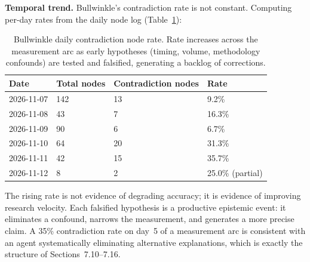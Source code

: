 \documentclass[11pt]{article}
\begin{document}
\textbf{Temporal trend.} Bullwinkle's contradiction rate is not constant. Computing per-day rates from the daily node log (Table~\ref{tab:bw-contradiction-daily}):

\begin{table}[h]
\centering
\begin{tabular}{llll}
\hline
Date & Total nodes & Contradiction nodes & Rate \\
\hline
2026-11-07 & 142 & 13 & 9.2\% \\
2026-11-08 &  43 &  7 & 16.3\% \\
2026-11-09 &  90 &  6 &  6.7\% \\
2026-11-10 &  64 & 20 & 31.3\% \\
2026-11-11 &  42 & 15 & 35.7\% \\
2026-11-12 &   8 &  2 & 25.0\% (partial) \\
\hline
\end{tabular}
\caption{Bullwinkle daily contradiction node rate. Rate increases across the measurement arc as early hypotheses (timing, volume, methodology confounds) are tested and falsified, generating a backlog of corrections.}
\label{tab:bw-contradiction-daily}
\end{table}

The rising rate is not evidence of degrading accuracy; it is evidence of improving research velocity. Each falsified hypothesis is a productive epistemic event: it eliminates a confound, narrows the measurement, and generates a more precise claim. A 35\% contradiction rate on day~5 of a measurement arc is consistent with an agent systematically eliminating alternative explanations, which is exactly the structure of Sections~7.10--7.16.
\end{document}
